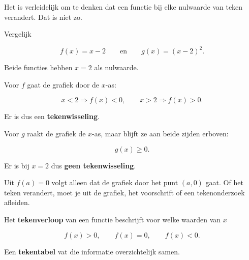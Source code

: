 \documentclass{ximera}
\begin{document}

Het is verleidelijk om te denken dat een functie bij elke nulwaarde
van teken verandert. Dat is niet zo.

Vergelijk

\[
f(x)=x-2
\qquad\text{en}\qquad
g(x)=(x-2)^2.
\]

Beide functies hebben \(x=2\) als nulwaarde.

\begin{center}
\end{center}

Voor \(f\) gaat de grafiek door de \(x\)-as:

\[
x<2 \Rightarrow f(x)<0,
\qquad
x>2 \Rightarrow f(x)>0.
\]

Er is dus een \textbf{tekenwisseling}.

Voor \(g\) raakt de grafiek de \(x\)-as, maar blijft ze aan beide
zijden erboven:

\[
g(x)\geq 0.
\]

Er is bij \(x=2\) dus \textbf{geen tekenwisseling}.

\begin{opmerking}
Uit \(f(a)=0\) volgt alleen dat de grafiek door het punt \((a,0)\) gaat.
Of het teken verandert, moet je uit de grafiek, het voorschrift
of een tekenonderzoek afleiden.
\end{opmerking}




\begin{definitie}
Het \textbf{tekenverloop} van een functie beschrijft voor welke
waarden van \(x\)

\[
f(x)>0,\qquad f(x)=0,\qquad f(x)<0.
\]

Een \textbf{tekentabel} vat die informatie overzichtelijk samen.
\end{definitie}
\end{document}
